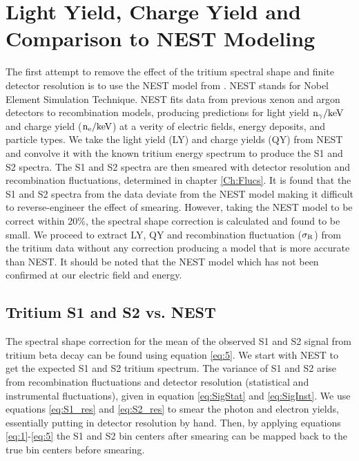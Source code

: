 \section{Light Yield, Charge Yield and Comparison to NEST Modeling}

The first attempt to remove the effect of the tritium spectral shape and finite detector resolution is to use the NEST model from \cite{NEST_2013}. 
NEST stands for Nobel Element Simulation Technique. NEST fits data from previous xenon and argon detectors to recombination models, producing predictions for light yield $\rm n_\gamma/keV$ and charge yield ($\rm n_e/keV$) at a verity of electric fields, energy deposits, and particle types. We take the light yield (LY) and charge yields (QY) from NEST and convolve it with the known tritium energy spectrum to produce the S1 and S2 spectra. The S1 and S2 spectra are then smeared with detector resolution and recombination fluctuations, determined in chapter \ref{Ch:Flucs}. It is found  that the S1 and S2 spectra from the data deviate from the NEST model making it difficult to reverse-engineer the effect of smearing. However, taking the NEST model to be correct within 20\%, the spectral shape correction is calculated and found to be small. We proceed to extract LY, QY and recombination fluctuation ($\rm \sigma_R$) from the tritium data without any correction producing a model that is more accurate than NEST. It should be noted that the NEST model which has not been confirmed at our electric field and energy. %



\subsection{Tritium S1 and S2 vs. NEST}
\label{sec:Spec_Corr}

The spectral shape correction for the mean of the observed S1 and S2 signal from tritium beta decay can be found using equation \ref{eq:5}. We start with NEST to get the expected S1 and S2 tritium spectrum. The variance of S1 and S2 arise from recombination fluctuations and detector resolution (statistical and instrumental fluctuations), given in equation \ref{eq:SigStat} and \ref{eq:SigInst}. We use equations \ref{eq:S1_res} and \ref{eq:S2_res} to smear the photon and electron yields, essentially putting in detector resolution by hand. Then, by applying equations \ref{eq:1}-\ref{eq:5} the S1 and S2 bin centers after smearing can be mapped back to the true bin centers before smearing.


